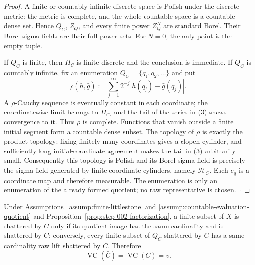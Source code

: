 \begin{proof}
A finite or countably infinite discrete space is Polish under the
discrete metric: the metric is complete, and the whole countable space is a
countable dense set. Hence \(Q_C\), \(Z_Q\), and every finite power \(Z_Q^N\)
are standard Borel. Their Borel sigma-fields are their full power sets. For
\(N=0\), the only point is the empty tuple.

If \(Q_C\) is finite, then \(H_C\) is finite discrete and the conclusion is
immediate. If \(Q_C\) is countably infinite, fix an enumeration
\(Q_C=\{q_1,q_2,\ldots\}\) and put
\[
\rho(\bar h,\bar g)
:=\sum_{j=1}^{\infty}2^{-j}
  |\bar h(q_j)-\bar g(q_j)|.
\tag{3}
\]
A \(\rho\)-Cauchy sequence is eventually constant in each coordinate; the
coordinatewise limit belongs to \(H_C\), and the tail of the series in (3)
shows convergence to it. Thus \(\rho\) is complete. Functions that vanish
outside a finite initial segment form a countable dense subset. The topology
of \(\rho\) is exactly the product topology: fixing finitely many coordinates
gives a clopen cylinder, and sufficiently long initial-coordinate agreement
makes the tail in (3) arbitrarily small. Consequently this topology is
Polish and its Borel sigma-field is precisely the sigma-field generated by
finite-coordinate cylinders, namely \(\mathcal H_C\). Each \(e_q\) is a
coordinate map and therefore measurable. The enumeration is only an
enumeration of the already formed quotient; no raw representative is chosen.
\(\square\)


\end{proof}

\begin{lemma}\label{lem:step-002-vc}
Under Assumptions~\ref{assump:finite-littlestone} and
\ref{assump:countable-evaluation-quotient} and
Proposition~\ref{prop:step-002-factorization}, a finite subset of \(X\) is
shattered by \(C\) only if its quotient image has the same cardinality and is
shattered by \(\bar C\); conversely, every finite subset of \(Q_C\) shattered
by \(\bar C\) has a same-cardinality raw lift shattered by \(C\). Therefore
\[
\operatorname{VC}(\bar C)=\operatorname{VC}(C)=v.
\tag{4}
\]


\end{lemma}

